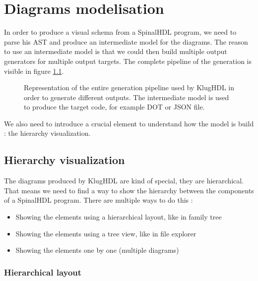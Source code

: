 \chapter{Diagrams modelisation}

In order to produce a visual schema from a SpinalHDL program, we need to parse
his AST and produce an intermediate model for the diagrams. The reason to use
an intermediate model is that we could then build multiple output generators
for multiple output targets. The complete pipeline of the generation is visible
in figure \ref{fig:generation-pipeline}.

\begin{figure}[H]
    \centering
    \caption[KlugHDL generation pipeline]{Representation of the entire generation
      pipeline used by KlugHDL in order to generate different outputs. The
      intermediate model is used to produce the target code, for example DOT or
      JSON file.}
    \label{fig:generation-pipeline}
\end{figure}

We also need to introduce a crucial element to understand how the model is
build : the hierarchy visualization.

\section{Hierarchy visualization}

The diagrams produced by KlugHDL are kind of special, they are hierarchical.
That means we need to find a way to show the hierarchy between the components
of a SpinalHDL program. There are multiple ways to do this :
\begin{itemize}
  \item Showing the elements using a hierarchical layout, like in family tree
  \item Showing the elements using a tree view, like in file explorer
  \item Showing the elements one by one (multiple diagrams)
\end{itemize}

\subsection{Hierarchical layout}
\label{sec:hierarchical-layout}

